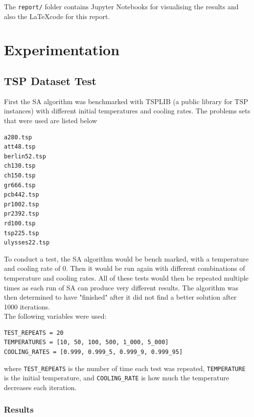 \documentclass{article}
\begin{document}
The \texttt{report/} folder contains Jupyter Notebooks for visualising the results and also the \LaTeX code for this report.

\newpage
\section{Experimentation}

\subsection{TSP Dataset Test}
First the SA algorithm was benchmarked with TSPLIB \cite{tsplib} (a public library for TSP instances) with different initial temperatures and cooling rates.
The problems sets that were used are listed below

\begin{multicols}{6}
\begin{verbatim}
a280.tsp
att48.tsp
berlin52.tsp
ch130.tsp
ch150.tsp
gr666.tsp
pcb442.tsp
pr1002.tsp
pr2392.tsp
rd100.tsp
tsp225.tsp
ulysses22.tsp
\end{verbatim}
\end{multicols}

To conduct a test, the SA algorithm would be bench marked, with a temperature and cooling rate of 0.
Then it would be run again with different combinations of temperature and cooling rates.
All of these tests would then be repeated multiple times as each run of SA can produce very different results.
The algorithm was then determined to have "finished" after it did not find a better solution after 1000 iterations.
\\

The following variables were used:

\begin{verbatim}
TEST_REPEATS = 20
TEMPERATURES = [10, 50, 100, 500, 1_000, 5_000]
COOLING_RATES = [0.999, 0.999_5, 0.999_9, 0.999_95]
\end{verbatim}

where \texttt{TEST\_REPEATS} is the number of time each test was repeated, \texttt{TEMPERATURE} is the initial temperature, and \texttt{COOLING\_RATE} is how much the temperature decreases each iteration.

\subsubsection{Results}
\end{document}

